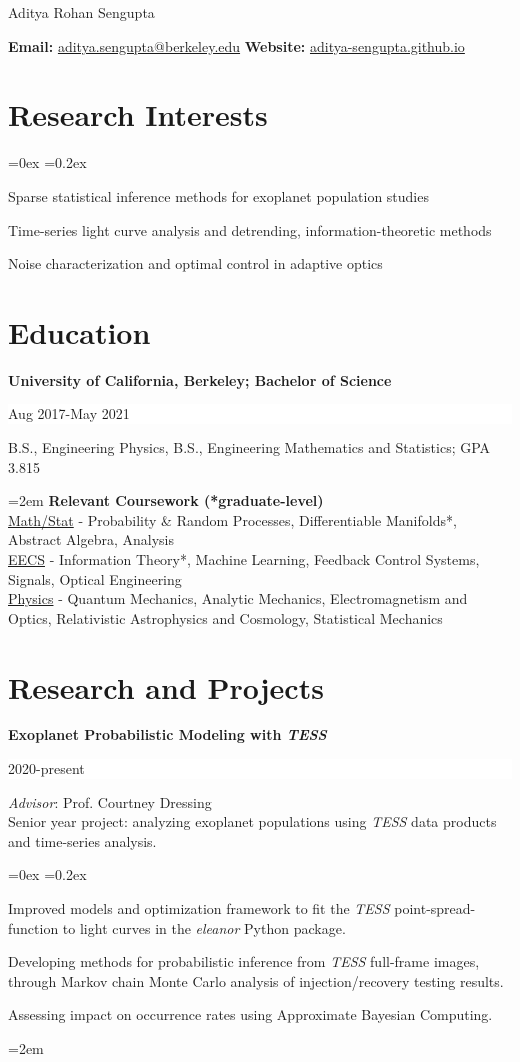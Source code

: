\documentclass[paper=a4,fontsize=12pt]{scrartcl}
\newcommand{\cvlist}{%

    \rightmargin=0in
    \leftmargin=0.15in
    \topsep=0ex
    \partopsep=0pt
    \itemsep=0.2ex 
    \parsep=0pt
    \itemindent=0.0\leftmargin
    \listparindent=3.0\leftmargin
    \settowidth{\labelsep}{~}
    \leftskip=-10.1in
    \parindent=-0.1in
}
\newcommand{\MyName}[1]{ %
                {\centering \Huge #1
                \par \normalsize \normalfont}}
\newcommand{\NewPart}[1]{\section*{{#1}}}
\newcommand{\EducationEntry}[4]{
		\noindent \textbf{#1} \hfill      %
		\colorbox{White}{%
			\parbox{5cm}{%
			\hfill\color{Black}#2}} \par  %
		\noindent #3 \par        %
		\noindent\hangindent=2em\hangafter=0 \small #4 %
		\normalsize \par}
\begin{document}
\MyName{Aditya Rohan Sengupta}

\vspace{0.4cm}
\noindent\textbf{Email:} \url{aditya.sengupta@berkeley.edu} \hfill \textbf{Website:} \url{aditya-sengupta.github.io} 
\vspace{-0.5cm}

\NewPart{Research Interests}
\begin{list}{}{\cvlist}
\item Sparse statistical inference methods for exoplanet population studies
\item Time-series light curve analysis and detrending, information-theoretic methods
\item Noise characterization and optimal control in adaptive optics
\end{list}

\NewPart{Education}

\EducationEntry{\noindent University of California, Berkeley; Bachelor of Science}{Aug 2017-May 2021}{B.S., Engineering Physics, B.S., Engineering Mathematics and Statistics; GPA 3.815}{\textbf{Relevant Coursework (*graduate-level)}\\\underline{Math/Stat} - Probability \& Random Processes, Differentiable Manifolds*, Abstract Algebra, Analysis\\\underline{EECS} - Information Theory*, Machine Learning, Feedback Control Systems, Signals, Optical Engineering\\ \underline{Physics} - Quantum Mechanics, Analytic Mechanics, Electromagnetism and Optics, Relativistic Astrophysics and Cosmology, Statistical Mechanics}
\noindent

\vspace{-0.5cm}
\NewPart{Research and Projects}

\EducationEntry{Exoplanet Probabilistic Modeling with \textit{TESS}}{2020-present}{
\textit{Advisor}: Prof. Courtney Dressing\\
Senior year project: analyzing exoplanet populations using \textit{TESS} data products and time-series analysis.

\begin{list}{\textbullet}{\cvlist}
    \item Improved models and optimization framework to fit the \textit{TESS} point-spread-function to light curves in the \textit{eleanor} Python package.
    \item Developing methods for probabilistic inference from \textit{TESS} full-frame images, through Markov chain Monte Carlo analysis of injection/recovery testing results.
    \item Assessing impact on occurrence rates using Approximate Bayesian Computing.
\end{list}
}
\hfill
\end{document}

